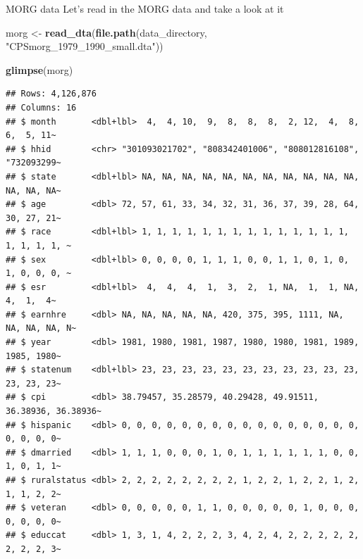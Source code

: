 \documentclass[
  ignorenonframetext,
]{beamer}
\newenvironment{Shaded}{\begin{snugshade}}{\end{snugshade}}
\newcommand{\FunctionTok}[1]{\textcolor[rgb]{0.13,0.29,0.53}{\textbf{#1}}}
\newcommand{\NormalTok}[1]{#1}
\newcommand{\OtherTok}[1]{\textcolor[rgb]{0.56,0.35,0.01}{#1}}
\newcommand{\StringTok}[1]{\textcolor[rgb]{0.31,0.60,0.02}{#1}}
\begin{document}
\begin{frame}[fragile]{MORG data}
\label{morg-data}
Let's read in the MORG data and take a look at it

\scriptsize

\begin{Shaded}
\begin{Highlighting}[]
\NormalTok{morg }\OtherTok{\textless{}{-}} \FunctionTok{read\_dta}\NormalTok{(}\FunctionTok{file.path}\NormalTok{(data\_directory, }\StringTok{"CPSmorg\_1979\_1990\_small.dta"}\NormalTok{))}

\FunctionTok{glimpse}\NormalTok{(morg)}
\end{Highlighting}
\end{Shaded}

\begin{verbatim}
## Rows: 4,126,876
## Columns: 16
## $ month       <dbl+lbl>  4,  4, 10,  9,  8,  8,  8,  2, 12,  4,  8,  6,  5, 11~
## $ hhid        <chr> "301093021702", "808342401006", "808012816108", "732093299~
## $ state       <dbl+lbl> NA, NA, NA, NA, NA, NA, NA, NA, NA, NA, NA, NA, NA, NA~
## $ age         <dbl> 72, 57, 61, 33, 34, 32, 31, 36, 37, 39, 28, 64, 30, 27, 21~
## $ race        <dbl+lbl> 1, 1, 1, 1, 1, 1, 1, 1, 1, 1, 1, 1, 1, 1, 1, 1, 1, 1, ~
## $ sex         <dbl+lbl> 0, 0, 0, 0, 1, 1, 1, 0, 0, 1, 1, 0, 1, 0, 1, 0, 0, 0, ~
## $ esr         <dbl+lbl>  4,  4,  4,  1,  3,  2,  1, NA,  1,  1, NA,  4,  1,  4~
## $ earnhre     <dbl> NA, NA, NA, NA, NA, 420, 375, 395, 1111, NA, NA, NA, NA, N~
## $ year        <dbl> 1981, 1980, 1981, 1987, 1980, 1980, 1981, 1989, 1985, 1980~
## $ statenum    <dbl+lbl> 23, 23, 23, 23, 23, 23, 23, 23, 23, 23, 23, 23, 23, 23~
## $ cpi         <dbl> 38.79457, 35.28579, 40.29428, 49.91511, 36.38936, 36.38936~
## $ hispanic    <dbl> 0, 0, 0, 0, 0, 0, 0, 0, 0, 0, 0, 0, 0, 0, 0, 0, 0, 0, 0, 0~
## $ dmarried    <dbl> 1, 1, 1, 0, 0, 0, 1, 0, 1, 1, 1, 1, 1, 1, 0, 0, 1, 0, 1, 1~
## $ ruralstatus <dbl> 2, 2, 2, 2, 2, 2, 2, 2, 1, 2, 2, 1, 2, 2, 1, 2, 1, 1, 2, 2~
## $ veteran     <dbl> 0, 0, 0, 0, 0, 1, 1, 0, 0, 0, 0, 0, 1, 0, 0, 0, 0, 0, 0, 0~
## $ educcat     <dbl> 1, 3, 1, 4, 2, 2, 2, 3, 4, 2, 4, 2, 2, 2, 2, 2, 2, 2, 2, 3~
\end{verbatim}
\end{frame}
\end{document}
